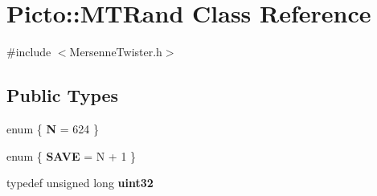 \hypertarget{class_picto_1_1_m_t_rand}{\section{Picto\-:\-:M\-T\-Rand Class Reference}
\label{class_picto_1_1_m_t_rand}
}


{\ttfamily \#include $<$Mersenne\-Twister.\-h$>$}

\subsection*{Public Types}
\begin{DoxyCompactItemize}
\item 
enum \{ {\bfseries N} = 624
 \}
\item 
enum \{ {\bfseries S\-A\-V\-E} = N + 1
 \}
\item 
\hypertarget{class_picto_1_1_m_t_rand_a0749e7a26c688a60c7b68daf067e8598}{typedef unsigned long {\bfseries uint32}}\label{class_picto_1_1_m_t_rand_a0749e7a26c688a60c7b68daf067e8598}

\end{DoxyCompactItemize}
